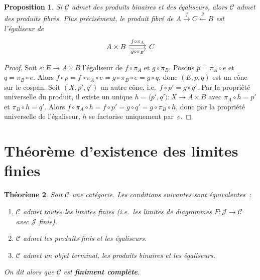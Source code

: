 \documentclass[a4paper,12pt]{book}
\newtheorem{theoreme}{Théorème}[chapter]
\newtheorem{proposition}[theoreme]{Proposition}
\begin{document}
\begin{proposition}\label{prop:pullback-egaliseur-produit}
Si $\mathcal{C}$ admet des produits binaires et des égaliseurs, alors
$\mathcal{C}$ admet des produits fibrés. Plus précisément, le produit fibré
de $A\xrightarrow{f}C\xleftarrow{g}B$ est l'égaliseur de
\[
\begin{tikzcd}
A\times B \arrow[r, shift left, "f\circ\pi_A"] \arrow[r, shift right, "g\circ\pi_B"'] & C
\end{tikzcd}
\]
\end{proposition}

\begin{proof}
Soit $e\colon E\to A\times B$ l'égaliseur de $f\circ\pi_A$ et $g\circ\pi_B$.
Posons $p=\pi_A\circ e$ et $q=\pi_B\circ e$.
Alors $f\circ p = f\circ\pi_A\circ e = g\circ\pi_B\circ e = g\circ q$,
donc $(E,p,q)$ est un cône sur le cospan.
Soit $(X,p',q')$ un autre cône, i.e.\ $f\circ p'=g\circ q'$.
Par la propriété universelle du produit, il existe un unique
$h=\langle p',q'\rangle\colon X\to A\times B$ avec
$\pi_A\circ h=p'$ et $\pi_B\circ h=q'$.
Alors $f\circ\pi_A\circ h = f\circ p' = g\circ q' = g\circ\pi_B\circ h$,
donc par la propriété universelle de l'égaliseur, $h$ se factorise
uniquement par~$e$.
\end{proof}


\section{Théorème d'existence des limites finies}\label{sec:existence-limites}

\begin{theoreme}\label{thm:existence-limites-finies}
Soit $\mathcal{C}$ une catégorie.
Les conditions suivantes sont équivalentes~:
\begin{enumerate}[label=(\roman*)]
\item $\mathcal{C}$ admet toutes les limites finies (i.e.\ les limites
      de diagrammes $F\colon\mathcal{J}\to\mathcal{C}$ avec $\mathcal{J}$ finie).
\item $\mathcal{C}$ admet les produits finis et les égaliseurs.
\item $\mathcal{C}$ admet un objet terminal, les produits binaires et
      les égaliseurs.
\end{enumerate}
On dit alors que $\mathcal{C}$ est \textbf{finiment complète}.
\end{theoreme}
\end{document}
